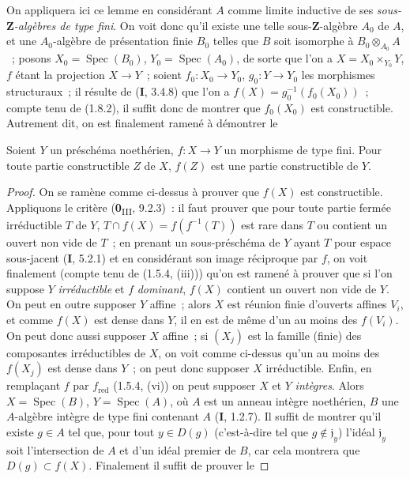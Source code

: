 On appliquera ici ce lemme en considérant $A$ comme limite inductive de ses
\emph{sous-$\mathbf Z$-algèbres de type fini}. On voit donc qu'il existe une
telle sous-$\mathbf Z$-algèbre $A_0$ de $A$, et une $A_0$-algèbre de
présentation finie $B_0$ telles que $B$ soit isomorphe à
$B_0\otimes_{A_0}A$~; posons $X_0=\operatorname{Spec}(B_0)$,
$Y_0=\operatorname{Spec}(A_0)$, de sorte que l'on a $X=X_0\times_{Y_0}Y$,
$f$ étant la projection $X\to Y$~; soient $f_0:X_0\to Y_0$,
$g_0:Y\to Y_0$ les morphismes structuraux~; il résulte de (\textbf{I}, 3.4.8) que
l'on a $f(X)=g_0^{-1}(f_0(X_0))$~; compte tenu de (1.8.2), il suffit donc de
montrer que $f_0(X_0)$ est constructible. Autrement dit, on est finalement
ramené à démontrer le

\begin{corollary}[1.8.5]
\label{IV.1.8.5-fr}
Soient $Y$ un préschéma noethérien, $f:X\to Y$ un morphisme de type fini.
Pour toute partie constructible $Z$ de $X$, $f(Z)$ est une partie
constructible de $Y$.
\end{corollary}


\begin{proof}
On se ramène comme ci-dessus à prouver que $f(X)$ est constructible.
Appliquons le critère (\textbf{0}\textsubscript{III}, 9.2.3)~: il faut prouver que pour
toute partie fermée irréductible $T$ de $Y$, $T\cap f(X)=f(f^{-1}(T))$ est
rare dans $T$ ou contient un ouvert non vide de $T$~; en prenant un
sous-préschéma de $Y$ ayant $T$ pour espace sous-jacent (\textbf{I}, 5.2.1) et en
considérant son image réciproque par $f$, on voit finalement (compte tenu de
(1.5.4, (iii))) qu'on est ramené à prouver que si l'on suppose $Y$
\emph{irréductible} et $f$ \emph{dominant}, $f(X)$ contient un ouvert non vide de
$Y$. On peut en outre supposer $Y$ affine~; alors $X$ est réunion finie
d'ouverts affines $V_i$, et comme $f(X)$ est dense dans $Y$, il en est de
même d'un au moins des $f(V_i)$. On peut donc aussi supposer $X$ affine~; si
$(X_j)$ est la famille (finie) des composantes irréductibles de $X$, on voit
comme ci-dessus qu'un au moins des $f(X_j)$ est dense dans $Y$~; on peut donc
supposer $X$ irréductible. Enfin, en remplaçant $f$ par $f_{\mathrm{red}}$
(1.5.4, (vi)) on peut supposer $X$ et $Y$ \emph{intègres}. Alors
$X=\operatorname{Spec}(B)$, $Y=\operatorname{Spec}(A)$, où $A$ est un
anneau intègre noethérien, $B$ une $A$-algèbre intègre de type fini contenant
$A$ (\textbf{I}, 1.2.7). Il suffit de montrer qu'il existe $g\in A$ tel que, pour tout
$y\in D(g)$ (c'est-à-dire tel que $g\notin\mathfrak j_y$) l'idéal
$\mathfrak j_y$ soit l'intersection de $A$ et d'un idéal premier de $B$, car
cela montrera que $D(g)\subset f(X)$. Finalement il suffit de prouver le
\end{proof}

